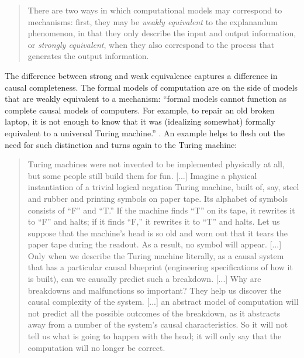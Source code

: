 \documentclass[a4paper, 11pt, twoside]{article}
\begin{document}
\begin{quote}
There are two ways in which computational models may correspond to mechanisms: first, they may be \textit{weakly equivalent} to the explanandum phenomenon, in that they only describe the input and output information, or \textit{strongly equivalent}, when they also correspond to the process that generates the output information. \parencite{Mikowski2016}
\end{quote}

The difference between strong and weak equivalence captures a difference in causal completeness. The formal models of computation are on the side of models that are weakly equivalent to a mechanism: ``formal models cannot function as complete causal models of computers. For example, to repair an old broken laptop, it is not enough to know that it was (idealizing somewhat) formally equivalent to a universal Turing machine.'' \parencite{Mikowski2016}. An example helps to flesh out the need for such distinction and turns again to the Turing machine:

\begin{quote}
Turing machines were not invented to be implemented physically at all, but some people still build them for fun. [...] Imagine a physical instantiation of a trivial logical negation Turing machine, built of, say, steel and rubber and printing symbols on paper tape. Its alphabet of symbols consists of ``F'' and ``T.'' If the machine finds ``T'' on its tape, it rewrites it to ``F'' and halts; if it finds ``F,'' it rewrites it to ``T'' and halts. Let us suppose that the machine’s head is so old and worn out that it tears the paper tape during the readout. As a result, no symbol will appear. [...] Only when we describe the Turing machine literally, as a causal system that has a particular causal blueprint (engineering specifications of how it is built), can we causally predict such a breakdown. [...] Why are breakdowns and malfunctions so important? They help us discover the causal complexity of the system. [...] an abstract model of computation will not predict all the possible outcomes of the breakdown, as it abstracts away from a number of the system’s causal characteristics. So it will not tell us what is going to happen with the head; it will only say that the computation will no longer be correct. \parencite{Mikowski2011}
\end{quote}
\end{document}
